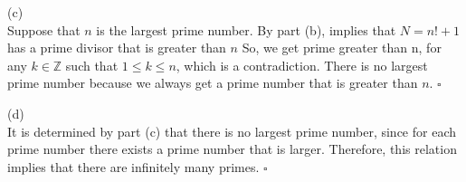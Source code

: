 \documentclass{article}
\begin{document}
\smallskip
(c)\\
Suppose that $n$ is the largest prime number. By part (b), implies that $N=n!+1$ has a prime divisor that is greater than $n$ So, we get prime greater than n, for any $k \in \mathbb{Z}$ such that $1 \leq k \leq n$, which is a contradiction. There is no largest prime number because we always get a prime number that is greater than $n$. $\square$

\smallskip
(d)\\
It is determined by part (c) that there is no largest prime number, since for each prime number there exists a prime number that is larger. Therefore, this relation implies that there are infinitely many primes. $\square$
\end{document}
